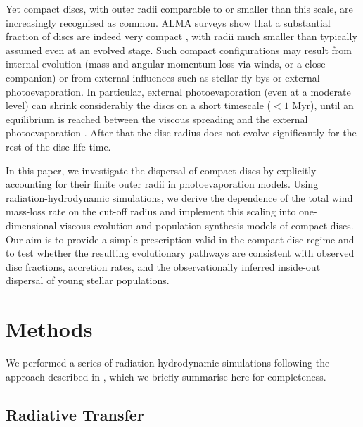 \documentclass[fleqn,usenatbib]{mnras}
\begin{document}
 Yet compact discs, with outer radii comparable to or smaller than this scale, are increasingly recognised as common.
 ALMA surveys show that a substantial fraction of discs are indeed very compact \citep[e.g.][]{Trapman_2025}, with radii much smaller than typically assumed even at an evolved stage. 
 Such compact configurations may result from internal evolution (mass and angular momentum loss via winds, or a close companion) or from external influences such as stellar fly-bys or external photoevaporation. 
 In particular, external photoevaporation (even at a moderate level) can shrink considerably the discs on a short timescale ($< 1$ Myr), until an equilibrium is reached between the viscous spreading and the external photoevaporation \citep{2020MNRAS.492.1279S, 2026arXiv260222050P}. After that the disc radius does not evolve significantly for the rest of the disc life-time.

 In this paper, we investigate the dispersal of compact discs by explicitly accounting for their finite outer radii in photoevaporation models.
 Using radiation-hydrodynamic simulations, we derive the dependence of the total wind mass-loss rate on the cut-off radius and implement this scaling into one-dimensional viscous evolution and population synthesis models of compact discs.
 Our aim is to provide a simple prescription valid in the compact-disc regime and to test whether the resulting evolutionary pathways are consistent with observed disc fractions, accretion rates, and the observationally inferred inside-out dispersal of young stellar populations.

\section{Methods}\label{sec:methods}

We performed a series of radiation hydrodynamic simulations following the approach described in \citet{2019MNRAS.487..691P}, which we briefly summarise here for completeness.

\subsection{Radiative Transfer}
\end{document}
